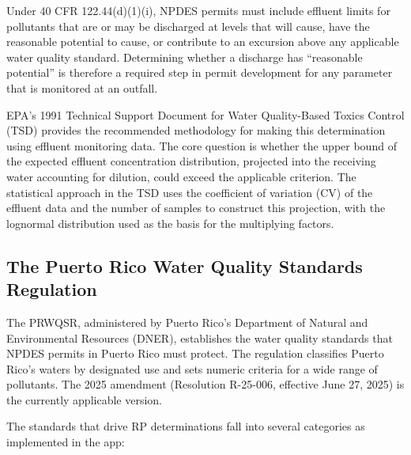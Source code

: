 \documentclass[
  11pt,
  letterpaper,
  DIV=11,
  numbers=noendperiod]{scrartcl}
\begin{document}
Under 40 CFR 122.44(d)(1)(i), NPDES permits must include effluent limits
for pollutants that are or may be discharged at levels that will cause,
have the reasonable potential to cause, or contribute to an excursion
above any applicable water quality standard. Determining whether a
discharge has ``reasonable potential'' is therefore a required step in
permit development for any parameter that is monitored at an outfall.

EPA's 1991 Technical Support Document for Water Quality-Based Toxics
Control (TSD) provides the recommended methodology for making this
determination using effluent monitoring data. The core question is
whether the upper bound of the expected effluent concentration
distribution, projected into the receiving water accounting for
dilution, could exceed the applicable criterion. The statistical
approach in the TSD uses the coefficient of variation (CV) of the
effluent data and the number of samples to construct this projection,
with the lognormal distribution used as the basis for the multiplying
factors.

\subsection{The Puerto Rico Water Quality Standards
Regulation}\label{sec-prwqs}

The PRWQSR, administered by Puerto Rico's Department of Natural and
Environmental Resources (DNER), establishes the water quality standards
that NPDES permits in Puerto Rico must protect. The regulation
classifies Puerto Rico's waters by designated use and sets numeric
criteria for a wide range of pollutants. The 2025 amendment (Resolution
R-25-006, effective June 27, 2025) is the currently applicable version.

The standards that drive RP determinations fall into several categories
as implemented in the app:
\end{document}
